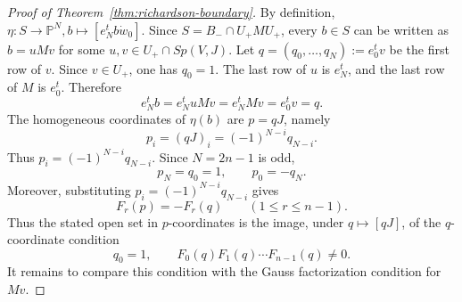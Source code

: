 \documentclass[10pt,a4paper]{amsart}
\newcommand{\PP}{\mathbb{P}}
\begin{document}
\begin{proof}[Proof of Theorem~\ref{thm:richardson-boundary}]
By definition, \(\eta:S\longrightarrow \PP^N,b\longmapsto [e_N^tb\dot w_0]\). Since \(S=B_-\cap U_+MU_+\), every \(b\in S\) can be written as \(b=uMv\) for some \(u,v\in U_+\cap Sp(V,J)\). Let \(q=(q_0,\ldots,q_N):=e_0^tv\) be the first row of \(v\). Since \(v\in U_+\), one has \(q_0=1\). The last row of \(u\) is \(e_N^t\), and the last row of \(M\) is \(e_0^t\). Therefore
\[
e_N^tb=e_N^tuMv=e_N^tMv=e_0^tv=q.
\]
The homogeneous coordinates of \(\eta(b)\) are \(p=qJ\), namely
\[
p_i=(qJ)_i=(-1)^{N-i}q_{N-i}.
\]
Thus \(p_i=(-1)^{N-i}q_{N-i}\). Since \(N=2n-1\) is odd,
\[
p_N=q_0=1,
\qquad
p_0=-q_N.
\]
Moreover, substituting \(p_i=(-1)^{N-i}q_{N-i}\) gives
\[
F_r(p)=-F_r(q)
\qquad
(1\le r\le n-1).
\]
Thus the stated open set in \(p\)-coordinates is the image, under \(q\mapsto [qJ]\), of the \(q\)-coordinate condition
\[
q_0=1,\qquad F_0(q)F_1(q)\cdots F_{n-1}(q)\ne0.
\]
It remains to compare this condition with the Gauss factorization condition for \(Mv\).


\end{proof}
\end{document}
